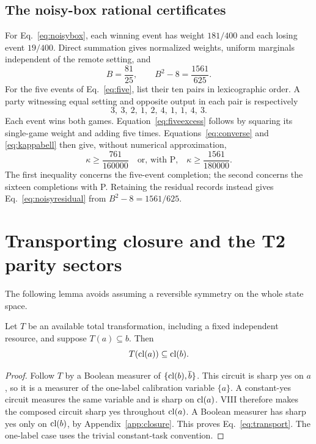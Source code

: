 \subsection{The noisy-box rational certificates}
For Eq.~\eqref{eq:noisybox}, each winning event has weight $181/400$ and each losing event $19/400$. Direct summation gives normalized weights, uniform marginals independent of the remote setting, and
\begin{equation}\label{eq:box-values}
 B=\frac{81}{25},\qquad B^2-8=\frac{1561}{625}.
\end{equation}
For the five events of Eq.~\eqref{eq:five}, list their ten pairs in lexicographic order. A party witnessing equal setting and opposite output in each pair is respectively
\begin{equation}\label{eq:five-witnesses}
 3,\ 3,\ 2,\ 1,\ 2,\ 4,\ 1,\ 1,\ 4,\ 3.
\end{equation}
Each event wins both games. Equation~\eqref{eq:fiveexcess} follows by squaring its single-game weight and adding five times. Equations~\eqref{eq:converse} and \eqref{eq:kappabell} then give, without numerical approximation,
\begin{equation}\label{eq:kappa-thresholds}
 \kappa\geq\frac{761}{160000}
 \quad\text{or, with P,}\quad
 \kappa\geq\frac{1561}{180000}.
\end{equation}
The first inequality concerns the five-event completion; the second concerns the sixteen completions with P. Retaining the residual records instead gives Eq.~\eqref{eq:noisyresidual} from $B^2-8=1561/625$.

\section{Transporting closure and the T2 parity sectors}\label{app:transport}
The following lemma avoids assuming a reversible symmetry on the whole state space.

\begin{lemma}\label{lem:transport}
Let $T$ be an available total transformation, including a fixed independent resource, and suppose $T(a)\subseteq b$. Then
\begin{equation}\label{eq:transport}
 T(\cl(a))\subseteq\cl(b).
\end{equation}
\end{lemma}
\begin{proof}
Follow $T$ by a Boolean measurer of $\{\operatorname{cl}(b),\overline b\}$. This circuit is sharp yes on $a$, so it is a measurer of the one-label calibration variable $\{a\}$. A constant-yes circuit measures the same variable and is sharp on $\operatorname{cl}(a)$. VIII therefore makes the composed circuit sharp yes throughout $\operatorname{cl}(a)$. A Boolean measurer has sharp yes only on $\operatorname{cl}(b)$, by Appendix~\ref{app:closure}. This proves Eq.~\eqref{eq:transport}. The one-label case uses the trivial constant-task convention.
\end{proof}

